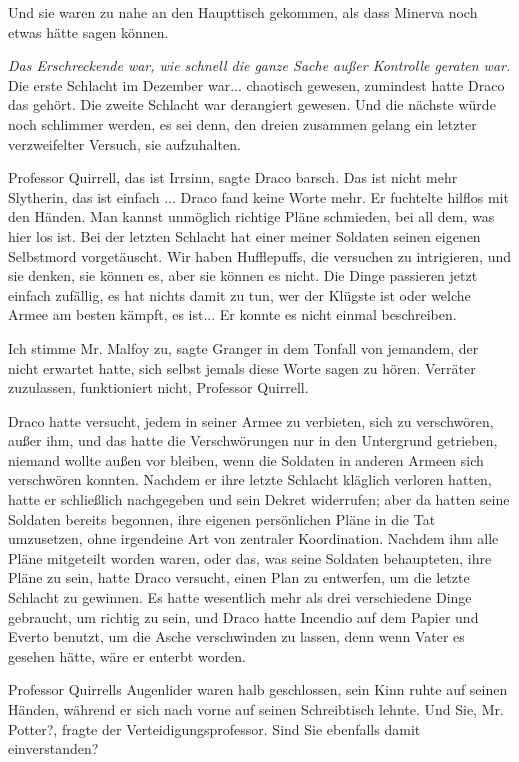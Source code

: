 Und sie waren zu nahe an den Haupttisch gekommen, als dass Minerva noch etwas
hätte sagen können.

\emph{Das Erschreckende war, wie schnell die ganze Sache außer Kontrolle
geraten war.} Die erste Schlacht im Dezember war... chaotisch gewesen, zumindest
hatte Draco das gehört. Die zweite Schlacht war derangiert gewesen. Und die
nächste würde noch schlimmer werden, es sei denn, den dreien zusammen gelang ein
letzter verzweifelter Versuch, sie aufzuhalten.

\glqq{}Professor Quirrell, das ist Irrsinn\grqq{}, sagte Draco barsch. \glqq{}Das
ist nicht mehr Slytherin, das ist einfach ...\grqq{} Draco fand keine Worte
mehr. Er fuchtelte hilflos mit den Händen. \glqq{}Man kannst unmöglich richtige
Pläne schmieden, bei all dem, was hier los ist. Bei der letzten Schlacht hat
einer meiner Soldaten seinen eigenen Selbstmord vorgetäuscht. Wir haben
Hufflepuffs, die versuchen zu intrigieren, und sie denken, sie können es, aber
sie können es nicht. Die Dinge passieren jetzt einfach zufällig, es hat nichts
damit zu tun, wer der Klügste ist oder welche Armee am besten kämpft, es
ist...\grqq{} Er konnte es nicht einmal beschreiben.

\glqq{}Ich stimme Mr. Malfoy zu\grqq{}, sagte Granger in dem Tonfall von
jemandem, der nicht erwartet hatte, sich selbst jemals diese Worte sagen zu
hören. \glqq{}Verräter zuzulassen, funktioniert nicht, Professor Quirrell.\grqq{}

Draco hatte versucht, jedem in seiner Armee zu verbieten, sich zu verschwören,
außer ihm, und das hatte die Verschwörungen nur in den Untergrund getrieben,
niemand wollte außen vor bleiben, wenn die Soldaten in anderen Armeen sich
verschwören konnten. Nachdem er ihre letzte Schlacht kläglich verloren hatten,
hatte er schließlich nachgegeben und sein Dekret widerrufen; aber da hatten
seine Soldaten bereits begonnen, ihre eigenen persönlichen Pläne in die Tat
umzusetzen, ohne irgendeine Art von zentraler Koordination. Nachdem ihm alle
Pläne mitgeteilt worden waren, oder das, was seine Soldaten behaupteten, ihre
Pläne zu sein, hatte Draco versucht, einen Plan zu entwerfen, um die letzte
Schlacht zu gewinnen. Es hatte wesentlich mehr als drei verschiedene Dinge
gebraucht, um richtig zu sein, und Draco hatte Incendio auf dem Papier und
Everto benutzt, um die Asche verschwinden zu lassen, denn wenn Vater es gesehen
hätte, wäre er enterbt worden.

Professor Quirrells Augenlider waren halb geschlossen, sein Kinn ruhte auf
seinen Händen, während er sich nach vorne auf seinen Schreibtisch lehnte. \glqq{}
Und Sie, Mr. Potter?\grqq{}, fragte der Verteidigungsprofessor. \glqq{}Sind Sie
ebenfalls damit einverstanden?\grqq{}


